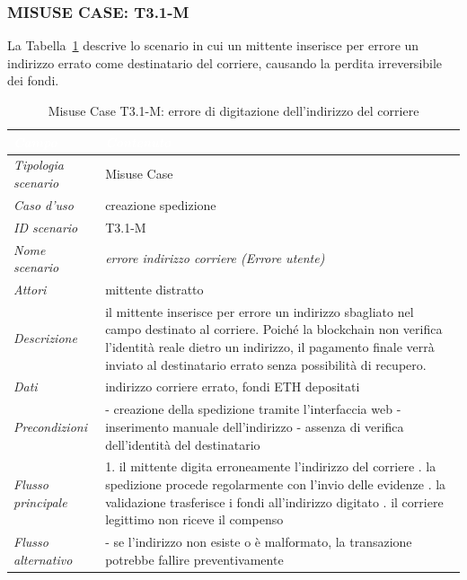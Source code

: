 \subsubsection*{MISUSE CASE: T3.1-M}
La Tabella~\ref{tab:t31m} descrive lo scenario in cui un mittente inserisce per errore un indirizzo errato come destinatario del corriere, causando la perdita irreversibile dei fondi.
\begin{longtable}{| >{\columncolor{misuseCol}}p{} | p{} |}
\caption{Misuse Case T3.1-M: errore di digitazione dell'indirizzo del corriere}\label{tab:t31m}\\
\hline
\rowcolor{misuseHeader} \textcolor{white}{\textit{Campo}} & \textcolor{white}{\textit{Contenuto}} \\
\hline
\textit{Tipologia scenario} & Misuse Case \\
\hline
\textit{Caso d'uso} & creazione spedizione \\
\hline
\textit{ID scenario} & T3.1-M \\
\hline
\textit{Nome scenario} & \textit{errore indirizzo corriere (Errore utente)} \\
\hline
\textit{Attori} & mittente distratto \\
\hline
\textit{Descrizione} & il mittente inserisce per errore un indirizzo sbagliato nel campo destinato al corriere. Poiché la blockchain non verifica l'identità reale dietro un indirizzo, il pagamento finale verrà inviato al destinatario errato senza possibilità di recupero. \\
\hline
\textit{Dati} & indirizzo corriere errato, fondi ETH depositati \\
\hline
\textit{Precondizioni} & - creazione della spedizione tramite l'interfaccia web \newline - inserimento manuale dell'indirizzo \newline - assenza di verifica dell'identità del destinatario \\
\hline
\textit{Flusso principale} & 1. il mittente digita erroneamente l'indirizzo del corriere \newline 2. la spedizione procede regolarmente con l'invio delle evidenze \newline 3. la validazione trasferisce i fondi all'indirizzo digitato \newline 4. il corriere legittimo non riceve il compenso \\
\hline
\textit{Flusso alternativo} & - se l'indirizzo non esiste o è malformato, la transazione potrebbe fallire preventivamente \\

\end{longtable}
